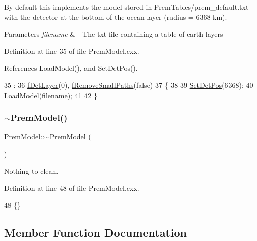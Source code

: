 By default this implements the model stored in Prem\+Tables/prem\+\_\+default.\+txt with the detector at the bottom of the ocean layer (radius = 6368 km).


\begin{DoxyParams}{Parameters}
{\em filename} & -\/ The txt file containing a table of earth layers \\
\hline
\end{DoxyParams}


Definition at line 35 of file Prem\+Model.\+cxx.



References Load\+Model(), and Set\+Det\+Pos().


\begin{DoxyCode}
35                                     :
36 \hyperlink{classOscProb_1_1PremModel_a4fb68506493666349f418b893a996185}{fDetLayer}(0), \hyperlink{classOscProb_1_1PremModel_a3973df6f5f2ff219cd2f865b31aacfd2}{fRemoveSmallPaths}(\textcolor{keyword}{false})
37 \{
38 
39   \hyperlink{classOscProb_1_1PremModel_a55b314e97ed9b92931e08ada0c0947eb}{SetDetPos}(6368);
40   \hyperlink{classOscProb_1_1PremModel_a6363a5e711dd8b0d2e684677e585b293}{LoadModel}(filename);
41 
42 \}
\end{DoxyCode}
\mbox{\label{classOscProb_1_1PremModel_aac484ca4e607f2b0fc6f599358cb95fb}} 
\subsubsection{\texorpdfstring{$\sim$\+Prem\+Model()}{~PremModel()}}
{\footnotesize\ttfamily Prem\+Model\+::$\sim$\+Prem\+Model (\begin{DoxyParamCaption}{ }\end{DoxyParamCaption})\hspace{0.3cm}{\ttfamily [virtual]}}

Nothing to clean. 

Definition at line 48 of file Prem\+Model.\+cxx.


\begin{DoxyCode}
48 \{\}
\end{DoxyCode}


\subsection{Member Function Documentation}
\mbox{\label{classOscProb_1_1PremModel_a08c337b84138adc46ee4dd002e9262d2}} 
